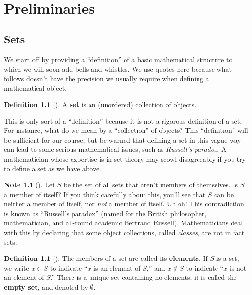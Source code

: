 \documentclass[10pt,openany,oneside]{book}
\newcommand{\terminology}[1]{\textbf{#1}}
\theoremstyle{plain}
\theoremstyle{definition}
\newtheorem{definition}[theorem]{Definition}
\theoremstyle{definition}
\newtheorem{note}[theorem]{Note}
\theoremstyle{definition}
\theoremstyle{definition}
\numberwithin{equation}{section}
\begin{document}
\chapter[{Preliminaries}]{Preliminaries}\label{pre}
\typeout{************************************************}
\typeout{************************************************}
\section[{Sets}]{Sets}\label{section-1}
We start off by providing a ``definition'' of a basic mathematical structure to which we will soon add bells and whistles. We use quotes here because what follows doesn't have the precision we usually require when defining a mathematical object.%
\begin{definition}[{}]\label{definition-1}
A \terminology{set} is an (unordered) collection of objects.%
\end{definition}
This is only sort of  a ``definition'' because it is not a rigorous definition of a set. For instance, what do we mean by a ``collection'' of objects? This ``definition'' will be sufficient for our course, but be warned that defining a set in this vague way can lead to some serious mathematical issues, such as \emph{Russell's paradox}.  A mathematician whose expertise is in set theory may scowl disagreeably if you try to define a set as we have above.%
\begin{note}[]\label{note-1}
Let \(S\) be the set of all sets that aren't members of themselves.  Is \(S\) a member of itself? If you think carefully about this, you'll see that \(S\) can be neither a member of itself, nor \emph{not} a member of itself. Uh oh!  This contradiction is known as ``Russell's paradox'' (named for the British philosopher, mathematician, and all-round academic Bertrand Russell). Mathematicians deal with this by declaring that some object collections, called \emph{classes}, are not in fact sets.%
\end{note}
\begin{definition}[{}]\label{definition-2}
\label{notation-1}
\label{notation-2}
\label{notation-3}
The members of a set are called its \terminology{elements}. If \(S\) is a set, we write \(x\in S\) to indicate ``\(x\) is an element of \(S\),'' and \(x \not\in S\) to indicate ``\(x\) is not an element of \(S\).'' There is a unique set containing no elements; it is called the \terminology{empty set}, and denoted by \(\emptyset\).%
\end{definition}
\end{document}
